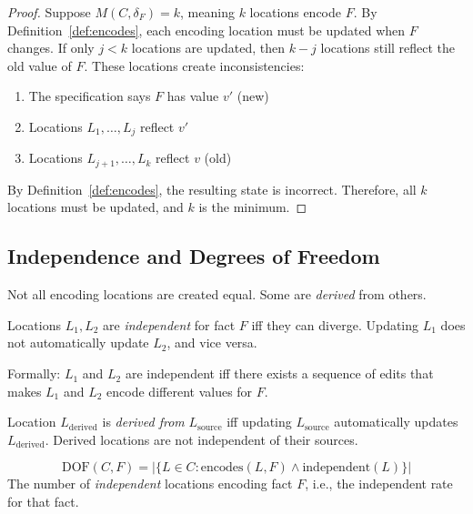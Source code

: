 \begin{proof}
Suppose $M(C, \delta_F) = k$, meaning $k$ locations encode $F$. By Definition~\ref{def:encodes}, each encoding location must be updated when $F$ changes. If only $j < k$ locations are updated, then $k - j$ locations still reflect the old value of $F$. These locations create inconsistencies:

\begin{enumerate}
\tightlist
\item The specification says $F$ has value $v'$ (new)
\item Locations $L_1, \ldots, L_j$ reflect $v'$
\item Locations $L_{j+1}, \ldots, L_k$ reflect $v$ (old)
\end{enumerate}

By Definition~\ref{def:encodes}, the resulting state is incorrect. Therefore, all $k$ locations must be updated, and $k$ is the minimum.
\end{proof}

\subsection{Independence and Degrees of Freedom}\label{sec:dof}

Not all encoding locations are created equal. Some are \emph{derived} from others.

\begin{definition}\label{def:independent}
Locations $L_1, L_2$ are \emph{independent} for fact $F$ iff they can diverge. Updating $L_1$ does not automatically update $L_2$, and vice versa.

Formally: $L_1$ and $L_2$ are independent iff there exists a sequence of edits that makes $L_1$ and $L_2$ encode different values for $F$.
\end{definition}

\begin{definition}\label{def:derived}
Location $L_{\text{derived}}$ is \emph{derived from} $L_{\text{source}}$ iff updating $L_{\text{source}}$ automatically updates $L_{\text{derived}}$. Derived locations are not independent of their sources.
\end{definition}

\begin{definition}\label{def:dof}
\[
\text{DOF}(C, F) = |\{L \in C : \text{encodes}(L, F) \land \text{independent}(L)\}|
\]
The number of \emph{independent} locations encoding fact $F$, i.e., the independent rate for that fact.
\end{definition}

